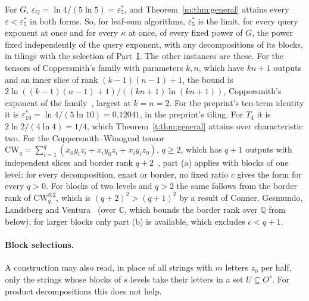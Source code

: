 \documentclass[11pt]{article}
\theoremstyle{definition}
\theoremstyle{remark}
\newcommand{\es}{\varepsilon^*_5}
\newcommand{\et}{\varepsilon^*_{10}}
\begin{document}
For $G$, $\varepsilon_G=\ln4/(5\ln5)=\es$, and Theorem~\ref{m:thm:general} attains every $\varepsilon<\es$ in both forms.
So, for leaf-sum algorithms, $\es$ is the limit, for every query exponent at once and for every $\kappa$ at once, of every fixed power of $G$, the power fixed independently of the query exponent, with any decompositions of its blocks, in tilings with the selection of Part~\hyperref[m:partI]{I}. The other instances are these. For the tensors of Coppersmith's family with parameters $k,n$, which have $kn+1$ outputs and an inner slice of rank $(k-1)(n-1)+1$, the bound is $2\ln((k-1)(n-1)+1)/((kn+1)\ln(kn+1))$, Coppersmith's exponent of the family~\cite[p.~469]{Cop82}, largest at $k=n=2$. For the preprint's ten-term identity it is $\et=\ln4/(5\ln10)=0.12041$, in the preprint's tiling. For $T_4$ it is $2\ln2/(4\ln4)=1/4$, which Theorem~\ref{t:thm:general} attains over characteristic two. For the Coppersmith--Winograd tensor $\mathrm{CW}_q=\sum_{i=1}^q(x_0y_iz_i+x_iy_0z_i+x_iy_iz_0)$, $q\ge2$, which has $q+1$ outputs with independent slices and border rank $q+2$~\cite{CW90}, part (a) applies with blocks of one level: for every decomposition, exact or border, no fixed ratio $c$ gives the form for every $q>0$. For blocks of two levels and $q>2$ the same follows from the border rank of $\mathrm{CW}_q^{\otimes2}$, which is $(q+2)^2>(q+1)^2$ by a result of Conner, Gesmundo, Landsberg and Ventura~\cite{CGLV19} (over $\mathbb C$, which bounds the border rank over $\mathbb Q$ from below); for larger blocks only part (b) is available, which excludes $c<q+1$.

\paragraph{Block selections.} A construction may also read, in place of all strings with $m$ letters $z_0$ per half, only the strings whose blocks of $s$ levels take their letters in a set $U\subseteq O^s$. For product decompositions this does not help.
\end{document}
